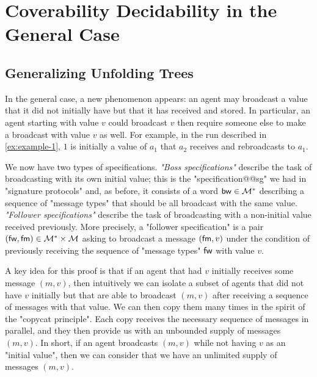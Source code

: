 
\section{Coverability Decidability in the General Case}
\label{sec:cover-general-case}

\subsection{Generalizing Unfolding Trees}
\label{sec:unfolding-trees-general}
In the general case, a new phenomenon appears: an agent may broadcast a value that it did not initially have but that it has received and stored. In particular, an agent starting with value $v$ could broadcast $v$ then require someone else to make a broadcast with value $v$ as well. For example, in the run described in \cref{ex:example-1}, $1$ is initially a value of $a_1$ that $a_2$ receives and rebroadcasts to $a_1$.

 We now have two types of specifications. \emph{"Boss specifications"} describe the task of broadcasting with its own initial value; this is the "specification@@sg" we had in "signature protocols" and, as before, it consists of a word $\mathsf{bw} \in \mathcal{M}^\ast$ describing a sequence of "message types" that should be all broadcast with the same value. \emph{"Follower specifications"} describe the task of broadcasting with a non-initial value received previously. More precisely, a "follower specification" is a pair $(\mathsf{fw}, \mathsf{fm}) \in \mathcal{M}^*\times \mathcal{M}$ asking to broadcast a message $(\mathsf{fm},v)$ under the condition of previously receiving the sequence of "message types" $\mathsf{fw}$ with value $v$.


A key idea for this proof is that if an agent that had $v$ initially receives some message $(m,v)$, then intuitively we can isolate a subset of agents that did not have $v$ initially but that are able to broadcast $(m,v)$ after receiving a sequence of messages with that value. We can then copy them many times in the spirit of the "copycat principle". Each copy receives the necessary sequence of messages in parallel, and they then provide us with an unbounded supply of messages $(m,v)$. In short, if an agent broadcasts $(m,v)$ while not having $v$ as an "initial value", then we can consider that we have an unlimited supply of messages $(m,v)$.

